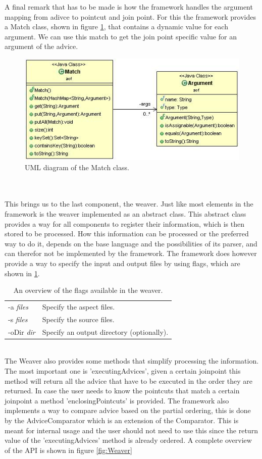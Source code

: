 \documentclass[a4paper]{report}
\begin{document}
A final remark that has to be made is how the framework handles the argument mapping from adivce to pointcut and join point. For this the framework provides a Match class, shown in figure \ref{fig:Match}, that contains a dynamic value for each argument. We can use this match to get the join point specific value for an argument of the advice.
\begin{figure}[h!]
\centering
\includegraphics[scale=0.7]{images/AOF/Match.jpg}
\caption{UML diagram of the Match class.}
\label{fig:Match}
\end{figure}\\
\\
This brings us to the last component, the weaver. Just like most elements in the framework is the weaver implemented as an abstract class. This abstract class provides a way for all components to register their information, which is then stored to be processed. How this information can be processed or the preferred way to do it, depends on the base language and the possibilities of its parser, and can therefor not be implemented by the framework. The framework does however provide a way to specify the input and output files by using flags, which are shown in \ref{tab:Flags}.\\
\begin{table}[h]
\centering
\begin{tabular}{l l}
-a \textit{files} & Specify the aspect files.\\ [2ex]
-s \textit{files} & Specify the source files.\\ [2ex]
-oDir \textit{dir} & Specify an output directory (optionally).\\
\end{tabular}
\caption{An overview of the flags available in the weaver.}
\label{tab:Flags}
\end{table}\\
The Weaver also provides some methods that simplify processing the information. The most important one is 'executingAdvices', given a certain joinpoint this method will return all the advice that have to be executed in the order they are returned. In case the user needs to know the pointcuts that match a certain joinpoint a method 'enclosingPointcuts' is provided. The framework also implements a way to compare advice based on the partial ordering, this is done by the AdviceComparator which is an extension of the Comparator. This is meant for internal usage and the user should not need to use this since the return value of the 'executingAdvices' method is already ordered. A complete overview of the API is shown in figure \ref{fig:Weaver}
\end{document}
